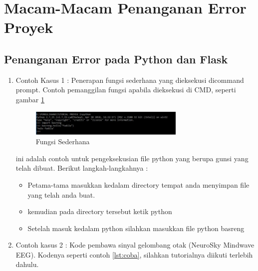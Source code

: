 \section{Macam-Macam Penanganan Error Proyek}
\subsection{Penanganan Error pada Python dan Flask}
\begin{enumerate}
  \item Contoh Kasus 1 : Penerapan fungsi sederhana yang dieksekusi dicommand prompt. Contoh pemanggilan fungsi apabila dieksekusi di CMD, seperti gambar \ref{fig:contohsederhana}

  \begin{figure}[!ht]
        \centerline{\includegraphics[width=0.70\textwidth]{figures/10/contohsederhana.jpg}}
	    \caption{Fungsi Sederhana}
	    \label{fig:contohsederhana}
  \end{figure}

ini adalah contoh untuk pengeksekusian file python yang berupa gunsi yang telah dibuat. Berikut langkah-langkahnya :
    \begin{itemize}
        \item Petama-tama masukkan kedalam directory tempat anda menyimpan file yang telah anda buat.
        \item kemudian pada directory tersebut ketik python
        \item Setelah masuk kedalam python silahkan masukkan file python basreng
    \end{itemize}

  \item Contoh kasus 2 : Kode pembawa sinyal gelombang otak (NeuroSky Mindwave EEG). Kodenya seperti contoh \ref{lst:coba}, silahkan tutorialnya diikuti terlebih dahulu.

\end{enumerate}

